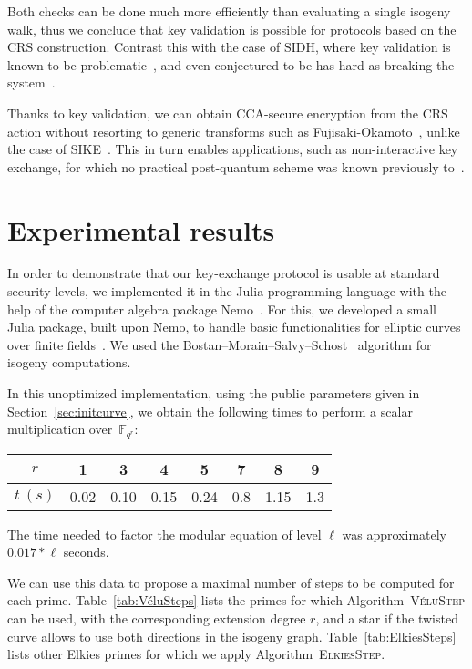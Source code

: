 \documentclass{article}
\newcommand{\F}{\mathbb{F}}
\newcommand{\algstyle}[1]{\textsc{#1}}
\theoremstyle{definition}
\begin{document}
\smallskip

Both checks can be done much more efficiently than evaluating a single
isogeny walk, thus we conclude that key validation is possible for
protocols based on the CRS construction. Contrast this with the case
of SIDH, where key validation is known to be
problematic~\cite{galbraithsecurity}, and even conjectured to be has
hard as breaking the system~\cite{cryptoeprint:2018:336}.

Thanks to key validation, we can obtain CCA-secure encryption from the
CRS action without resorting to generic transforms such as
Fujisaki-Okamoto~\cite{10.1007/3-540-48405-1_34}, unlike the case of
SIKE~\cite{SIKE,10.1007/978-3-319-70500-2_12}. This in turn enables
applications, such as non-interactive key exchange, for which no
practical post-quantum scheme was known previously to~\cite{csidh}.


\section{Experimental results}
\label{sec:exp}

In order to demonstrate that our key-exchange protocol is usable
at standard security levels, we implemented it in the Julia
programming language with the help of the computer algebra package
Nemo~\cite{todo:Nemo}. For this, we developed a small
Julia package, built upon Nemo, to handle basic functionalities
for elliptic curves over finite fields~\cite{todo:package}.
We used the Bostan--Morain--Salvy--Schost~\cite{todo:BMSS} algorithm for
isogeny computations.

In this unoptimized implementation, 
using the public parameters given in
Section~\ref{sec:initcurve},
we obtain
the following times to perform a scalar multiplication over~$\F_{q^r}$:

\begin{center}
\begin{tabular}{c|ccccccc}
$r$ & 1 & 3 & 4 & 5 & 7 & 8 & 9 \\
\hline
$t\ (s)$ & 0.02 & 0.10 & 0.15 & 0.24 & 0.8 & 1.15 & 1.3
\end{tabular}
\end{center}
The time needed to factor the modular equation of level $\ell$
was approximately $0.017 * \ell$ seconds.

We can use this data to propose a maximal number of steps to be
computed for each prime. Table~\ref{tab:VéluSteps}
lists the primes for which Algorithm~\algstyle{VéluStep} can be used, with
the corresponding extension degree $r$, and a star if the twisted curve
allows to use both directions in the isogeny graph.
Table~\ref{tab:ElkiesSteps}
lists other Elkies primes for which we apply Algorithm~\algstyle{ElkiesStep}.
\end{document}
